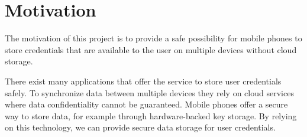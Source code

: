 \section{Motivation}
\label{motivation}
The motivation of this project is to provide a safe possibility for mobile phones to store credentials that are available to the user on multiple devices without cloud storage.

There exist many applications that offer the service to store user credentials safely. To synchronize data between multiple devices they rely on cloud services where data confidentiality cannot be guaranteed.
Mobile phones offer a secure way to store data, for example through hardware-backed key storage.
By relying on this technology, we can provide secure data storage for user credentials. 